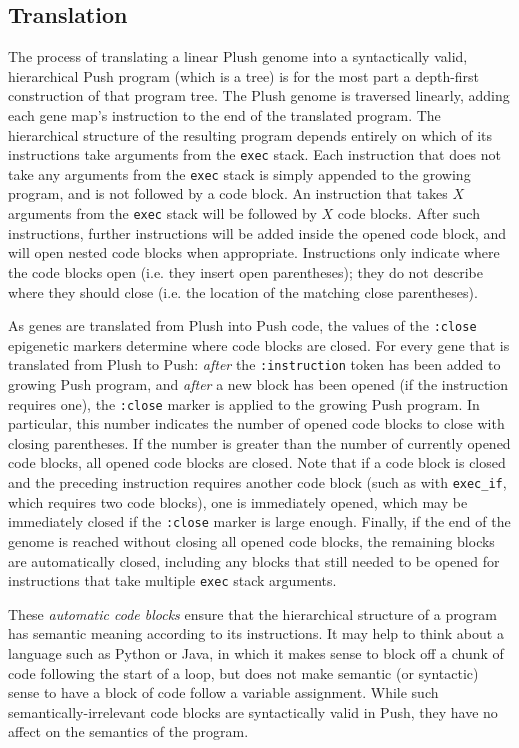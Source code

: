 \documentclass[graybox]{svmult}
\begin{document}
\subsection{Translation}

The process of translating a linear Plush genome into a syntactically valid, hierarchical Push program (which is a tree) is for the most part a depth-first construction of that program tree. The Plush genome is traversed linearly, adding each gene map's instruction to the end of the translated program. The hierarchical structure of the resulting program depends entirely on which of its instructions take arguments from the \texttt{exec} stack. Each instruction that does not take any arguments from the \texttt{exec} stack is simply appended to the growing program, and is not followed by a code block. An instruction that takes $X$ arguments from the \texttt{exec} stack will be followed by $X$ code blocks. After such instructions, further instructions will be added inside the opened code block, and will open nested code blocks when appropriate. Instructions only indicate where the code blocks open (i.e. they insert open parentheses); they do not describe where they should close (i.e. the location of the matching close parentheses).

As genes are translated from Plush into Push code, the values of the \texttt{:close} epigenetic markers determine where code blocks are closed. For every gene that is translated from Plush to Push: \textit{after} the \texttt{:instruction} token has been added to growing Push program, and \textit{after} a new block has been opened (if the instruction requires one), the \texttt{:close} marker is applied to the growing Push program. In particular, this number indicates the number of opened code blocks to close with closing parentheses. If the number is greater than the number of currently opened code blocks, all opened code blocks are closed. Note that if a code block is closed and the preceding instruction requires another code block (such as with \texttt{exec\_if}, which requires two code blocks), one is immediately opened, which may be immediately closed if the \texttt{:close} marker is large enough. Finally, if the end of the genome is reached without closing all opened code blocks, the remaining blocks are automatically closed, including any blocks that still needed to be opened for instructions that take multiple \texttt{exec} stack arguments.

These \textit{automatic code blocks} ensure that the hierarchical structure of a program has semantic meaning according to its instructions. It may help to think about a language such as Python or Java, in which it makes sense to block off a chunk of code following the start of a loop, but does not make semantic (or syntactic) sense to have a block of code follow a variable assignment. While such semantically-irrelevant code blocks are syntactically valid in Push, they have no affect on the semantics of the program.
\end{document}
